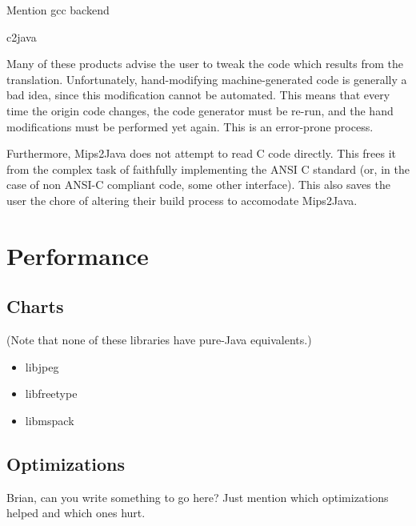 \documentclass{acmconf}
\begin{document}
Mention gcc backend

c2java

Many of these products advise the user to tweak the code which results
from the translation.  Unfortunately, hand-modifying machine-generated
code is generally a bad idea, since this modification cannot be
automated.  This means that every time the origin code changes, the
code generator must be re-run, and the hand modifications must be
performed yet again.  This is an error-prone process.

Furthermore, Mips2Java does not attempt to read C code directly.  This
frees it from the complex task of faithfully implementing the ANSI C
standard (or, in the case of non ANSI-C compliant code, some other
interface).  This also saves the user the chore of altering their
build process to accomodate Mips2Java.


\section{Performance}

\subsection{Charts}

(Note that none of these libraries have pure-Java equivalents.)

\begin{itemize}
\item libjpeg
\item libfreetype
\item libmspack
\end{itemize}


\subsection{Optimizations}

Brian, can you write something to go here?  Just mention which
optimizations helped and which ones hurt.
\end{document}
